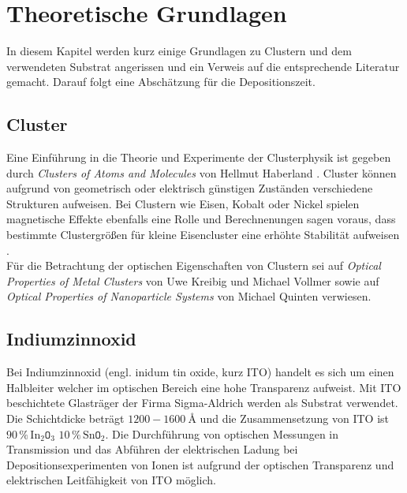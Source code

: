 \chapter{Theoretische Grundlagen}
In diesem Kapitel werden kurz einige Grundlagen zu Clustern und dem verwendeten Substrat angerissen und ein Verweis auf die entsprechende Literatur gemacht. Darauf folgt eine Abschätzung für die Depositionszeit.
\section{Cluster}
Eine Einführung in die Theorie und Experimente der Clusterphysik ist gegeben durch \textit{Clusters of Atoms and Molecules} von Hellmut Haberland \cite{haberland}.
Cluster können aufgrund von geometrisch oder elektrisch günstigen Zuständen verschiedene Strukturen aufweisen.
Bei Clustern wie Eisen, Kobalt oder Nickel spielen magnetische Effekte ebenfalls eine Rolle und Berechnenungen sagen voraus, dass bestimmte Clustergrößen für kleine Eisencluster eine erhöhte Stabilität aufweisen \cite{Kim.2014}.\\

Für die Betrachtung der optischen Eigenschaften von Clustern sei auf \textit{Optical Properties of Metal Clusters} \cite{kreibig} von Uwe Kreibig und Michael Vollmer sowie auf \textit{Optical Properties of Nanoparticle Systems} \cite{Quinten.2011} von Michael Quinten verwiesen.

\section{Indiumzinnoxid}
Bei Indiumzinnoxid (engl. inidum tin oxide, kurz ITO) handelt es sich um einen Halbleiter welcher im optischen Bereich eine hohe Transparenz aufweist.  
Mit ITO beschichtete Glasträger der Firma Sigma-Aldrich \cite{sigmaaldrich} werden als Substrat verwendet.
Die Schichtdicke beträgt $1200-1600\SI{}{\angstrom}$ und die Zusammensetzung von ITO ist $90\,\% \,\text{In}_2\texttt{O}_3$ $10\,\% \,\text{Sn}\texttt{O}_2$.
Die Durchführung von optischen Messungen in Transmission und das Abführen der elektrischen Ladung bei Depositionsexperimenten von Ionen ist aufgrund der optischen Transparenz und elektrischen Leitfähigkeit von ITO möglich.



